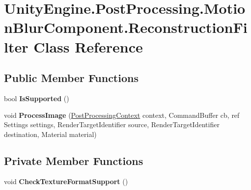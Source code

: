 \hypertarget{class_unity_engine_1_1_post_processing_1_1_motion_blur_component_1_1_reconstruction_filter}{}\section{Unity\+Engine.\+Post\+Processing.\+Motion\+Blur\+Component.\+Reconstruction\+Filter Class Reference}
\label{class_unity_engine_1_1_post_processing_1_1_motion_blur_component_1_1_reconstruction_filter}
\subsection*{Public Member Functions}
\begin{DoxyCompactItemize}
\item 
\mbox{\label{class_unity_engine_1_1_post_processing_1_1_motion_blur_component_1_1_reconstruction_filter_a1ae5385e2ce35105c89b09d668d08cb5}} 
bool {\bfseries Is\+Supported} ()
\item 
\mbox{\label{class_unity_engine_1_1_post_processing_1_1_motion_blur_component_1_1_reconstruction_filter_a10805735f3c20028314f16e0bc6e06b5}} 
void {\bfseries Process\+Image} (\hyperlink{class_unity_engine_1_1_post_processing_1_1_post_processing_context}{Post\+Processing\+Context} context, Command\+Buffer cb, ref Settings settings, Render\+Target\+Identifier source, Render\+Target\+Identifier destination, Material material)
\end{DoxyCompactItemize}
\subsection*{Private Member Functions}
\begin{DoxyCompactItemize}
\item 
\mbox{\label{class_unity_engine_1_1_post_processing_1_1_motion_blur_component_1_1_reconstruction_filter_a47e9e106b3b0e581ed3d9f3b444fddc3}} 
void {\bfseries Check\+Texture\+Format\+Support} ()
\end{DoxyCompactItemize}
